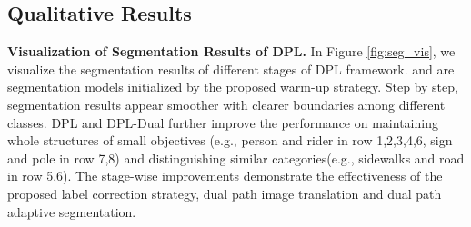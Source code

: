 \documentclass[10pt,twocolumn,letterpaper]{article}
\begin{document}
\subsection{Qualitative Results}
{\noindent \textbf{Visualization of Segmentation Results of DPL.}}\hspace{3pt}
In Figure \ref{fig:seg_vis}, we visualize the segmentation results of different stages of DPL framework.  and  are segmentation models initialized by the proposed warm-up strategy. Step by step, segmentation results appear smoother with clearer boundaries among different classes. DPL and DPL-Dual further improve the performance on maintaining whole structures of small objectives (e.g., person and rider in row 1,2,3,4,6, sign and pole in row 7,8) and distinguishing similar categories(e.g., sidewalks and road in row 5,6). The stage-wise improvements demonstrate the effectiveness of the proposed label correction strategy, dual path image translation and dual path adaptive segmentation.
\renewcommand{\arraystretch}{1}
\end{document}
